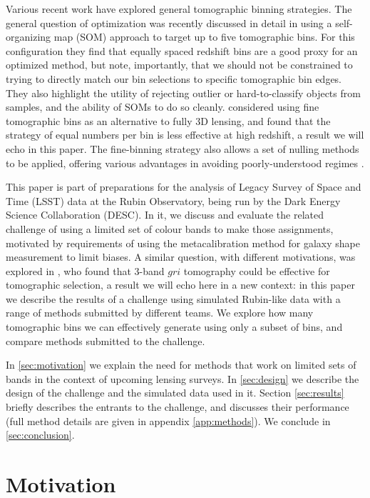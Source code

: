 \documentclass[twocolumn,twocolappendix]{aastex63}
\begin{document}
Various recent work have explored general tomographic binning strategies. The general question of optimization
was recently discussed in detail
in \citet{rainbow} using a self-organizing map (SOM) approach to target up to five tomographic bins.  For this
configuration they find that equally spaced redshift bins are a good proxy
for an optimized method, but note, importantly, that we should not be constrained to trying to directly
match our bin selections to specific tomographic bin edges. 
They also highlight the utility of rejecting outlier or hard-to-classify objects from samples, and the ability of SOMs
to do so cleanly.
\citet{taylor18} considered using
fine tomographic bins as an alternative to fully 3D lensing, and found that the strategy of equal numbers
per bin is less effective at high redshift, a result we will echo in this paper. The fine-binning strategy
also allows a set of nulling methods to be applied, offering various advantages in avoiding poorly-understood
regimes \citep{taylor18b,bnt,xcut}.

This paper is part of preparations for the analysis of Legacy Survey of Space and Time (LSST) data at the Rubin Observatory, being run by the Dark Energy Science Collaboration (DESC).
In it, we discuss and evaluate the related challenge
of using a limited set of colour bands to make those assignments, motivated by requirements of using the
metacalibration method for galaxy shape measurement to limit biases.  
A similar question, with different motivations, was explored in \citet{jain}, who found that 3-band 
$gri$ tomography could be effective for tomographic selection, a result we will echo here in a new context: in this paper we describe the results of a 
challenge using simulated Rubin-like data with a range of methods submitted by different teams.  We explore how many tomographic bins we can effectively generate using only a subset of bins, and compare methods submitted to the challenge.

In \autoref{sec:motivation} we explain the need for methods that work on limited sets of bands in the context of upcoming lensing surveys. In \autoref{sec:design} we describe the design of the challenge and the simulated data used in it.
Section \ref{sec:results} briefly describes the entrants to the challenge, and discusses their performance (full
method details are given in appendix \ref{app:methods}).
 We conclude in \autoref{sec:conclusion}.

\section{Motivation}
\label{sec:motivation}
\end{document}
